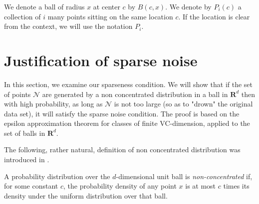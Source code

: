 \documentclass[orivec]{llncs}
\newcommand{\mc}{\mathcal}
\newcommand{\mb}{\mathbf}
\begin{document}
We denote a ball of radius $x$ at center $c$ by $B(c, x)$. We denote by $P_{i}(c)$ a collection of $i$ many points sitting on the same location $c$. If the location is clear from the context, we will use the notation $P_i$.



\section{Justification of sparse noise}
\label{Noise_justify}

In this section, we examine our sparseness condition. We will show that if the set of points $\mc N$ are generated by a non concentrated distribution in a ball in $\mb R^d$ then with high probability, as long as $\mc N$ is not too large (so as to "drown" the original data set), it will satisfy the sparse noise condition. The proof is based on the epsilon approximation theorem for classes of finite VC-dimension, applied to the set of balls in $\mb R^d$. 

The following, rather natural, definition of non concentrated distribution was introduced in \cite{balcan2012distributed}.
\begin{definition} 
A probability distribution over the $d$-dimensional unit ball is \emph{non-concentrated} if, for some constant $c$, the probability density of any point $x$ is at most $c$ times its density under the uniform distribution over that ball.
\end{definition}
\end{document}
